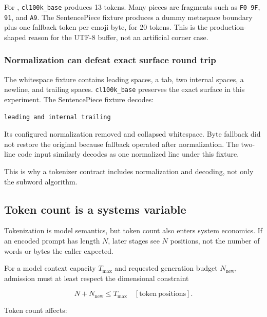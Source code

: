 \documentclass[
  10pt,
]{article}
\begin{document}
For ,
\texttt{cl100k\_base} produces 13 tokens. Many pieces are fragments such
as \texttt{F0\ 9F}, \texttt{91}, and \texttt{A9}. The SentencePiece
fixture produces a dummy metaspace boundary plus one fallback token per
emoji byte, for 20 tokens. This is the production-shaped reason for the
UTF-8 buffer, not an artificial corner case.

\subsubsection{Normalization can defeat exact surface round
trip}\label{normalization-can-defeat-exact-surface-round-trip}

The whitespace fixture contains leading spaces, a tab, two internal
spaces, a newline, and trailing spaces. \texttt{cl100k\_base} preserves
the exact surface in this experiment. The SentencePiece fixture decodes:

\begin{verbatim}
leading and internal trailing
\end{verbatim}

Its configured normalization removed and collapsed whitespace. Byte
fallback did not restore the original because fallback operated after
normalization. The two-line code input similarly decodes as one
normalized line under this fixture.

This is why a tokenizer contract includes normalization and decoding,
not only the subword algorithm.

\subsection{Token count is a systems
variable}\label{token-count-is-a-systems-variable}

Tokenization is model semantics, but token count also enters system
economics. If an encoded prompt has length \(N\), later stages see \(N\)
positions, not the number of words or bytes the caller expected.

For a model context capacity \(T_{\max}\) and requested generation
budget \(N_{\mathrm{new}}\), admission must at least respect the
dimensional constraint

\[
N+N_{\mathrm{new}}\le T_{\max}\quad[\mathrm{token\ positions}].
\]

Token count affects:
\end{document}
